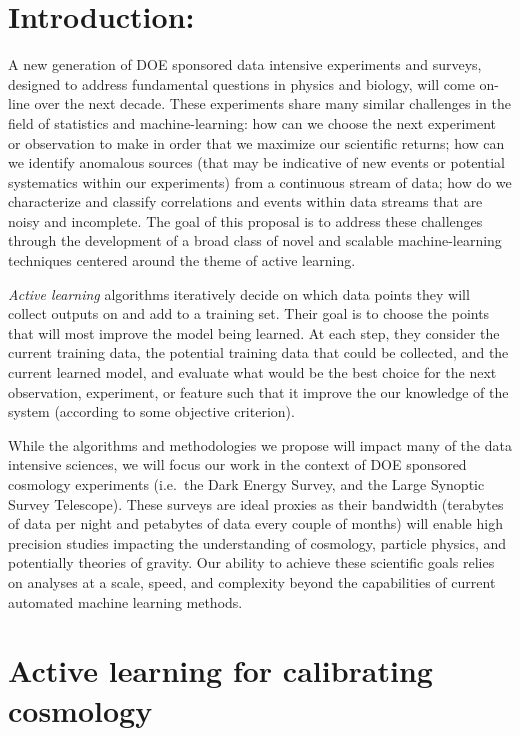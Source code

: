 \documentclass[useAMS,usenatbib,tightenlines,11pt,preprint]{aastex}
\begin{document}
\section{Introduction:}
A new generation of DOE sponsored data intensive experiments and
surveys, designed to address fundamental questions in physics and
biology, will come on-line over the next decade. These experiments
share many similar challenges in the field of statistics and
machine-learning: how can we choose the next experiment or observation
to make in order that we maximize our scientific returns; how can we
identify anomalous sources (that may be indicative of new events or
potential systematics within our experiments) from a continuous stream
of data; how do we characterize and classify correlations and events
within data streams that are noisy and incomplete. The goal of this
proposal is to address these challenges through the development of a broad
class of novel and scalable machine-learning techniques centered
around the theme of active learning.

{\it Active learning} algorithms iteratively decide on which data
points they will collect outputs on and add to a training set.  Their
goal is to choose the points that will most improve the model being
learned.  At each step, they consider the current training data, the
potential training data that could be collected, and the current
learned model, and evaluate what would be the best choice for the next
observation, experiment, or feature such that it improve the our
knowledge of the system (according to some objective criterion).


While the algorithms and methodologies we propose will impact many of
the data intensive sciences, we will focus our work in the context of
DOE sponsored cosmology experiments (i.e.\ the Dark Energy Survey, and
the Large Synoptic Survey Telescope). These surveys are ideal proxies
as their bandwidth (terabytes of data per night and petabytes of data
every couple of months) will enable high precision studies impacting
the understanding of cosmology, particle physics, and potentially
theories of gravity.  Our ability to achieve these scientific goals
relies on analyses at a scale, speed, and complexity beyond the
capabilities of current automated machine learning methods.


\section{Active learning for calibrating cosmology}
\end{document}
